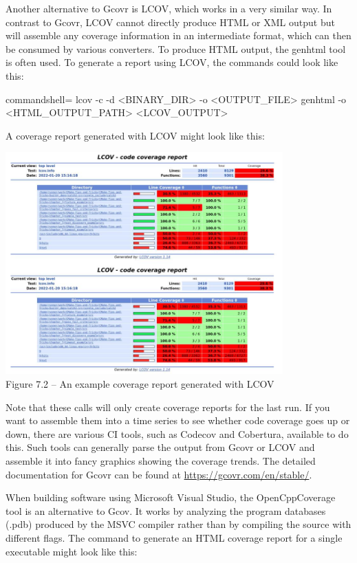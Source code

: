 Another alternative to Gcovr is LCOV, which works in a very similar way. In contrast to Gcovr, LCOV cannot directly produce HTML or XML output but will assemble any coverage information in an intermediate format, which can then be consumed by various converters. To produce HTML output, the genhtml tool is often used. To generate a report using LCOV, the commands could look like this:

\begin{tcblisting}{commandshell={}}
lcov -c -d <BINARY_DIR> -o <OUTPUT_FILE>
genhtml -o <HTML_OUTPUT_PATH> <LCOV_OUTPUT>
\end{tcblisting}

A coverage report generated with LCOV might look like this:

\begin{center}
\includegraphics[width=0.8\textwidth]{content/2/chapter7/images/2.jpg}\\
Figure 7.2 – An example coverage report generated with LCOV
\end{center}

Note that these calls will only create coverage reports for the last run. If you want to assemble them into a time series to see whether code coverage goes up or down, there are various CI tools, such as Codecov and Cobertura, available to do this. Such tools can generally parse the output from Gcovr or LCOV and assemble it into fancy graphics showing the coverage trends. The detailed documentation for Gcovr can be found at \url{https://gcovr.com/en/stable/}.


When building software using Microsoft Visual Studio, the OpenCppCoverage tool is an alternative to Gcov. It works by analyzing the program databases (.pdb) produced by the MSVC compiler rather than by compiling the source with different flags. The command to generate an HTML coverage report for a single executable might look like this:

